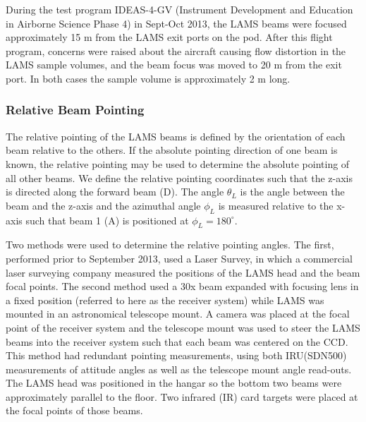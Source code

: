 \documentclass[12pt,twoside,english]{article}\usepackage[]{graphicx}\usepackage[]{color}
\let\OrgIndex\index
\renewcommand*{\index}[1]{\OrgIndex{#1}}
\begin{document}
During the test program IDEAS-4-GV (Instrument Development and Education in Airborne Science Phase 4) in Sept-Oct 2013, the LAMS beams were focused approximately 15 m from the LAMS exit ports on the pod. After this flight program, concerns were raised about the aircraft causing flow distortion in the LAMS sample  volumes, and the beam focus was moved to 20 m from the exit port. In both cases the sample volume is approximately 2 m long. 

\subsubsection{Relative Beam Pointing}

The relative pointing of the LAMS beams is defined by the orientation of each beam relative to the others. If the absolute pointing direction of one beam is known, the relative pointing may be used to determine the absolute pointing of all other beams. We define the relative pointing coordinates such that the z-axis is directed along the forward beam (D). The angle $\theta_{L}$ is the angle between the beam and the z-axis and the azimuthal angle $\phi_{L}$ is measured relative to the x-axis such that beam 1 (A) is positioned at $\phi_{L}=180^{\circ}$.

Two methods were used to determine the relative pointing angles. The first, performed prior to September 2013, used a Laser Survey, in which a commercial laser surveying company measured the positions of the LAMS head and the beam focal points. The second method used a 30x beam expanded with focusing lens in a fixed position (referred to here as the receiver system) while LAMS was mounted in an astronomical telescope mount. A camera was placed at the focal point of the receiver system and the telescope mount was used to steer the LAMS beams into the receiver system such that each beam was centered on the CCD. This method had redundant pointing measurements, using both IRU(SDN500) measurements of attitude angles as well as the telescope mount angle read-outs. 
The LAMS head was positioned in the hangar so the bottom two beams were approximately parallel to the floor. Two infrared (IR) card targets were placed at the focal points of those beams. 
\end{document}
